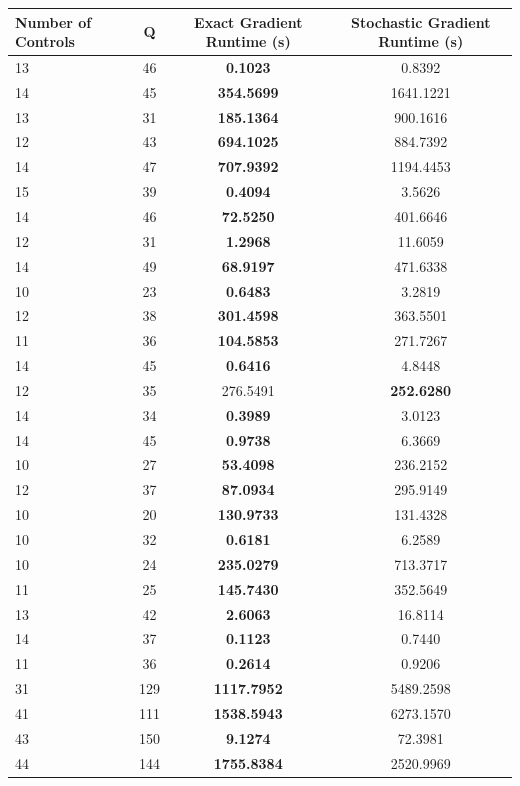 \documentclass{article}
\begin{document}
\begin{table}[h]
\centering
\begin{tabular}{lccc}
\toprule
Number of Controls & Q & Exact Gradient Runtime (s) & Stochastic Gradient Runtime (s) \\
\midrule
13 & 46 & \textbf{0.1023} & 0.8392 \\
14 & 45 & \textbf{354.5699} & 1641.1221 \\
13 & 31 & \textbf{185.1364} & 900.1616 \\
12 & 43 & \textbf{694.1025} & 884.7392 \\
14 & 47 & \textbf{707.9392} & 1194.4453 \\
15 & 39 & \textbf{0.4094} & 3.5626 \\
14 & 46 & \textbf{72.5250} & 401.6646 \\
12 & 31 & \textbf{1.2968} & 11.6059 \\
14 & 49 & \textbf{68.9197} & 471.6338 \\
10 & 23 & \textbf{0.6483} & 3.2819 \\
12 & 38 & \textbf{301.4598} & 363.5501 \\
11 & 36 & \textbf{104.5853} & 271.7267 \\
14 & 45 & \textbf{0.6416} & 4.8448 \\
12 & 35 & 276.5491 & \textbf{252.6280} \\
14 & 34 & \textbf{0.3989} & 3.0123 \\
14 & 45 & \textbf{0.9738} & 6.3669 \\
10 & 27 & \textbf{53.4098} & 236.2152 \\
12 & 37 & \textbf{87.0934} & 295.9149 \\
10 & 20 & \textbf{130.9733} & 131.4328 \\
10 & 32 & \textbf{0.6181} & 6.2589 \\
10 & 24 & \textbf{235.0279} & 713.3717 \\
11 & 25 & \textbf{145.7430} & 352.5649 \\
13 & 42 & \textbf{2.6063} & 16.8114 \\
14 & 37 & \textbf{0.1123} & 0.7440 \\
11 & 36 & \textbf{0.2614} & 0.9206 \\
31 & 129 & \textbf{1117.7952} & 5489.2598 \\
41 & 111 & \textbf{1538.5943} & 6273.1570 \\
43 & 150 & \textbf{9.1274} & 72.3981 \\
44 & 144 & \textbf{1755.8384} & 2520.9969 \\

\end{tabular}
\end{table}
\end{document}
